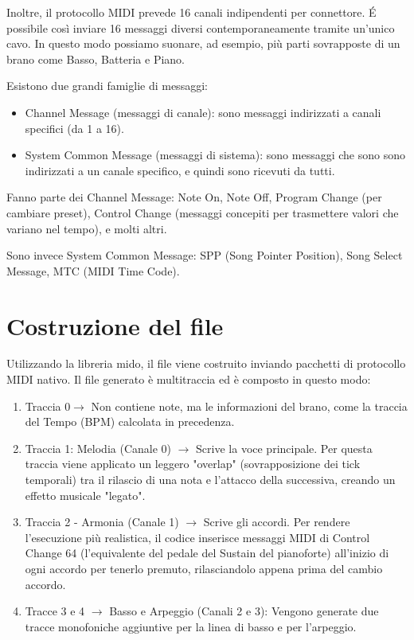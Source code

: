 Inoltre, il protocollo MIDI prevede 16 canali indipendenti per connettore. É possibile così inviare 16 messaggi diversi contemporaneamente tramite un’unico cavo. In questo modo possiamo suonare, ad esempio, più parti sovrapposte di un brano come Basso, Batteria e Piano.

Esistono due grandi famiglie di messaggi:

\begin{itemize}
    \item Channel Message (messaggi di canale): sono messaggi indirizzati a canali specifici (da 1 a 16).
    \item System Common Message (messaggi di sistema): sono messaggi che sono sono indirizzati a un canale specifico, e quindi sono ricevuti da tutti.

\end{itemize}
Fanno parte dei Channel Message: Note On, Note Off, Program Change (per cambiare preset), Control Change (messaggi concepiti per trasmettere valori che variano nel tempo), e molti altri.

Sono invece System Common Message: SPP (Song Pointer Position), Song Select Message, MTC (MIDI Time Code).


\section{Costruzione del file}


Utilizzando la libreria mido, il file viene costruito inviando pacchetti di protocollo MIDI nativo. Il file generato è multitraccia ed è composto in questo modo:
\begin{enumerate}
    \item Traccia 0$\rightarrow$ Non contiene note, ma le informazioni del brano, come la traccia del Tempo (BPM) calcolata in precedenza.
    \item Traccia 1: Melodia (Canale 0) $\rightarrow$ Scrive la voce principale. Per questa traccia viene applicato un leggero "overlap" (sovrapposizione dei tick temporali) tra il rilascio di una nota e l'attacco della successiva, creando un effetto musicale "legato".
    \item Traccia 2 - Armonia (Canale 1) $\rightarrow$ Scrive gli accordi. Per rendere l'esecuzione più realistica, il codice inserisce messaggi MIDI di Control Change 64 (l'equivalente del pedale del Sustain del pianoforte) all'inizio di ogni accordo per tenerlo premuto, rilasciandolo appena prima del cambio accordo.
    \item Tracce 3 e 4 $\rightarrow$  Basso e Arpeggio (Canali 2 e 3): Vengono generate due tracce monofoniche aggiuntive per la linea di basso e per l'arpeggio.
\end{enumerate}

